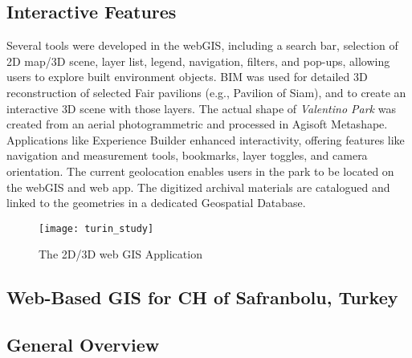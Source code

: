\subsection*{Interactive Features}

Several tools were developed in the web\gls{GIS}, including a search bar, selection of \gls{2D} map/\gls{3D} scene, layer list, legend, navigation, filters, and pop-ups, allowing users to explore built environment objects. 
\gls{BIM} was used for detailed \gls{3D} reconstruction of selected Fair pavilions (e.g., Pavilion of Siam), and to create an interactive \gls{3D} scene with those layers. 
The actual shape of \textit{Valentino Park} was created from an aerial photogrammetric and processed in Agisoft Metashape. Applications like Experience Builder
enhanced interactivity, offering features like navigation and measurement tools, bookmarks, layer toggles, and camera orientation. The current geolocation enables users in the park to be located on the web\gls{GIS} and web app. 
The digitized archival materials are catalogued and linked to the geometries in a dedicated Geospatial Database. 
 

\begin{figure}[h!]
  \centering
  \texttt{[image: turin\_study]}
  \caption{The \gls{2D}/\gls{3D} web \gls{GIS} Application}
  \label{fig:turin_study}
\end{figure}
\FloatBarrier




\subsection{Web-Based \gls{GIS} for \gls{CH} of Safranbolu, Turkey} 
\label{sec:gis_safranbolu}

\subsection*{General Overview}


